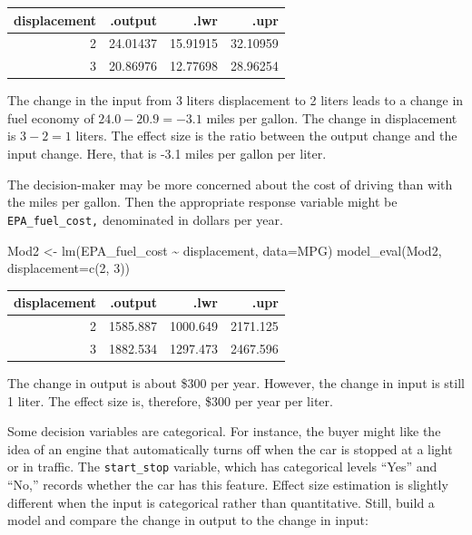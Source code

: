 \documentclass[
  letterpaper,
  DIV=11,
  numbers=noendperiod,
  oneside]{scrreprt}
\newenvironment{Shaded}{\begin{snugshade}}{\end{snugshade}}
\newcommand{\AttributeTok}[1]{\textcolor[rgb]{0.40,0.45,0.13}{#1}}
\newcommand{\DecValTok}[1]{\textcolor[rgb]{0.68,0.00,0.00}{#1}}
\newcommand{\FunctionTok}[1]{\textcolor[rgb]{0.28,0.35,0.67}{#1}}
\newcommand{\NormalTok}[1]{\textcolor[rgb]{0.00,0.23,0.31}{#1}}
\newcommand{\OtherTok}[1]{\textcolor[rgb]{0.00,0.23,0.31}{#1}}
\newcommand{\SpecialCharTok}[1]{\textcolor[rgb]{0.37,0.37,0.37}{#1}}
\begin{document}
\begin{tcolorbox}
\ttfamily 
\begin{tabular}{rrrr}
\toprule
displacement & .output & .lwr & .upr\\
\midrule
2 & 24.01437 & 15.91915 & 32.10959\\
3 & 20.86976 & 12.77698 & 28.96254\\
\bottomrule
\end{tabular} \normalfont
\bigskip

The change in the input from 3 liters displacement to 2 liters leads to
a change in fuel economy of \(24.0 - 20.9 = -3.1\) miles per gallon. The
change in displacement is \(3 - 2 = 1\) liters. The effect size is the
ratio between the output change and the input change. Here, that is -3.1
miles per gallon per liter.

The decision-maker may be more concerned about the cost of driving than
with the miles per gallon. Then the appropriate response variable might
be \texttt{EPA\_fuel\_cost,} denominated in dollars per year.

\begin{Shaded}
\begin{Highlighting}[]
\NormalTok{Mod2 }\OtherTok{\textless{}{-}} \FunctionTok{lm}\NormalTok{(EPA\_fuel\_cost }\SpecialCharTok{\textasciitilde{}}\NormalTok{ displacement, }\AttributeTok{data=}\NormalTok{MPG)}
\FunctionTok{model\_eval}\NormalTok{(Mod2, }\AttributeTok{displacement=}\FunctionTok{c}\NormalTok{(}\DecValTok{2}\NormalTok{, }\DecValTok{3}\NormalTok{))}
\end{Highlighting}
\end{Shaded}

\ttfamily 
\begin{tabular}{rrrr}
\toprule
displacement & .output & .lwr & .upr\\
\midrule
2 & 1585.887 & 1000.649 & 2171.125\\
3 & 1882.534 & 1297.473 & 2467.596\\
\bottomrule
\end{tabular} \normalfont
\bigskip

The change in output is about \$300 per year. However, the change in
input is still 1 liter. The effect size is, therefore, \$300 per year
per liter.

\end{tcolorbox}

Some decision variables are categorical. For instance, the buyer might
like the idea of an engine that automatically turns off when the car is
stopped at a light or in traffic. The \texttt{start\_stop} variable,
which has categorical levels ``Yes'' and ``No,'' records whether the car
has this feature. Effect size estimation is slightly different when the
input is categorical rather than quantitative. Still, build a model and
compare the change in output to the change in input:
\end{document}
